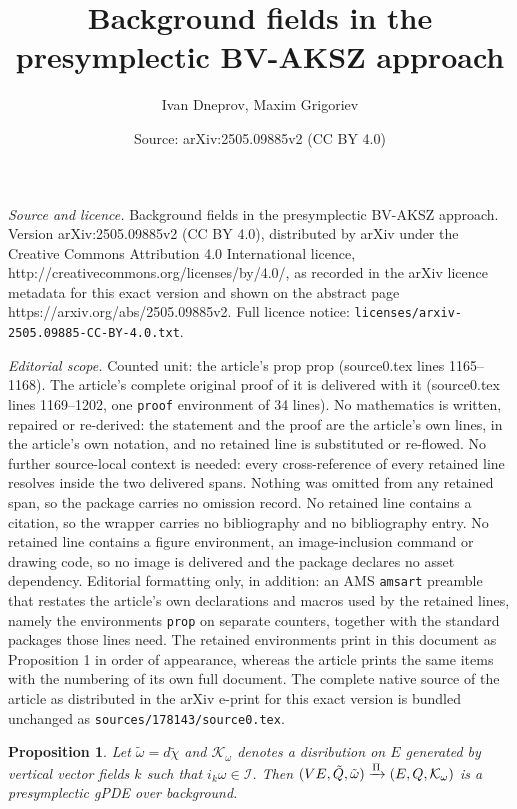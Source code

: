 \documentclass[10pt,a4paper]{amsart}
\title{Background fields in the presymplectic BV-AKSZ approach}
\author{Ivan Dneprov, Maxim Grigoriev}
\date{Source: arXiv:2505.09885v2 (CC BY 4.0)}
\newtheorem{prop}{Proposition}
\def\cI{\mathcal{I}}
\def\cK{\mathcal{K}}
\renewcommand{\tilde}{\widetilde}
\begin{document}
\maketitle

\noindent\emph{Source and licence.} Background fields in the presymplectic BV-AKSZ approach. Version arXiv:2505.09885v2 (CC BY 4.0), distributed by arXiv under the Creative Commons Attribution 4.0 International licence, http://creativecommons.org/licenses/by/4.0/, as recorded in the arXiv licence metadata for this exact version and shown on the abstract page https://arxiv.org/abs/2505.09885v2. Full licence notice: \texttt{licenses/arxiv-2505.09885-CC-BY-4.0.txt}.\par\smallskip

\noindent\textit{Editorial scope.} Counted unit: the article's prop prop (source0.tex lines 1165--1168). The article's complete original proof of it is delivered with it (source0.tex lines 1169--1202, one \texttt{proof} environment of 34 lines). No mathematics is written, repaired or re-derived: the statement and the proof are the article's own lines, in the article's own notation, and no retained line is substituted or re-flowed.  No further source-local context is needed: every cross-reference of every retained line resolves inside the two delivered spans.  Nothing was omitted from any retained span, so the package carries no omission record.  No retained line contains a citation, so the wrapper carries no bibliography and no bibliography entry.  No retained line contains a figure environment, an image-inclusion command or drawing code, so no image is delivered and the package declares no asset dependency.  Editorial formatting only, in addition: an AMS \texttt{amsart} preamble that restates the article's own declarations and macros used by the retained lines, namely the environments \texttt{prop} on separate counters, together with the standard packages those lines need.  The retained environments print in this document as Proposition 1 in order of appearance, whereas the article prints the same items with the numbering of its own full document.  The complete native source of the article as distributed in the arXiv e-print for this exact version is bundled unchanged as \texttt{sources/178143/source0.tex}.
\begin{prop}
Let $\tilde\omega=d\tilde\chi$ and $\cK_\omega$ denotes a disribution on $E$ generated by vertical vector fields $k$ such that $i_k\omega\in \cI$. Then 
    $(VE,\Tilde{Q}, \Tilde{\omega}) \xrightarrow{\Pi} (E,Q, \cK_\omega)$ is a presymplectic gPDE over background.
\end{prop}
\end{document}
